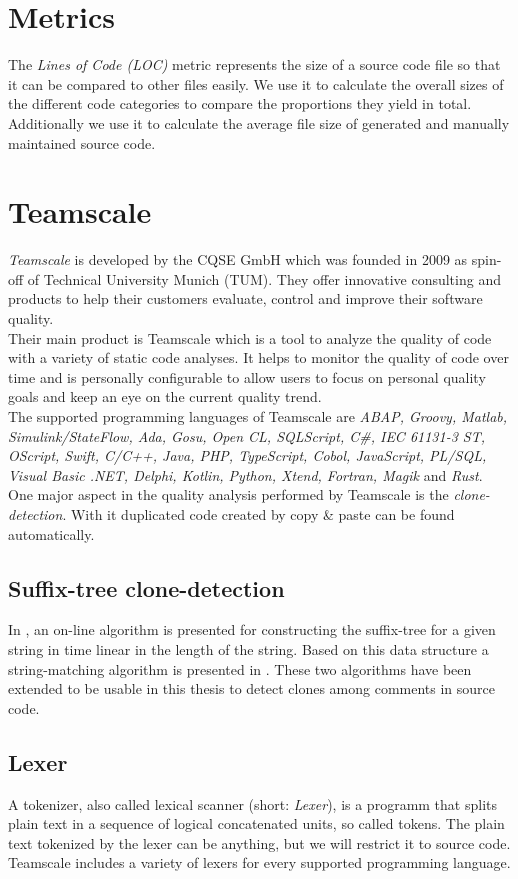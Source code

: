 \section{Metrics}
The \textit{Lines of Code (LOC)} metric represents the size of a source code file so that it can be compared to other files easily. We use it to calculate the overall sizes of the different code categories to compare the proportions they yield in total. Additionally we use it to calculate the average file size of generated and manually maintained source code.

\section{Teamscale}
\label{section:teamscale}
\textit{Teamscale} is developed by the CQSE GmbH which was founded in 2009 as spin-off of Technical University Munich (TUM). They offer innovative consulting and products to help their customers evaluate, control and improve their software quality.\\
Their main product is Teamscale which is a tool to analyze the quality of code with a variety of static code analyses. It helps to monitor the quality of code over time and is personally configurable to allow users to focus on personal quality goals and keep an eye on the current quality trend.\\
The supported programming languages of Teamscale are \textit{ABAP, Groovy, Matlab, Simulink/StateFlow, Ada, Gosu, Open CL, SQLScript, C\#, IEC 61131-3 ST, OScript, Swift, C/C++, Java, PHP, TypeScript, Cobol, JavaScript, PL/SQL, Visual Basic .NET, Delphi, Kotlin, Python, Xtend, Fortran, Magik} and \textit{Rust}.\\
One major aspect in the quality analysis performed by Teamscale is the \textit{clone-detection}. With it duplicated code created by copy \& paste can be found automatically.

\subsection{Suffix-tree clone-detection}
In \cite{Ukkonen1995}, an on-line algorithm is presented for constructing the suffix-tree for a given string in time linear in the length of the string. Based on this data structure a string-matching algorithm is presented in \cite{Ukkonen1993}. These two algorithms have been extended to be usable in this thesis to detect clones among comments in source code.

\subsection{Lexer}
A tokenizer, also called lexical scanner (short: \textit{Lexer}), is a programm that splits plain text in a sequence of logical concatenated units, so called tokens. The plain text tokenized by the lexer can be anything, but we will restrict it to source code. Teamscale includes a variety of lexers for every supported programming language. 

